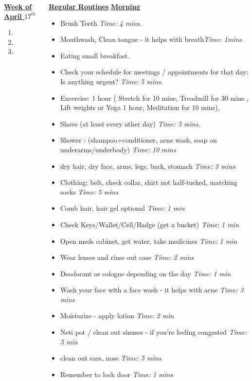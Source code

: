 \documentclass[serif, mathserif, final]{beamer}
\newcommand{\timeEst}[1]{\textit{Time:} \textit{#1}}
\begin{document}
{\begin{frame}{}
\begin{columns}
\begin{column}{0.5\linewidth}
\begin{block}{\small \underline{\textbf{Week of April $17^{th}$}}}
\begin{enumerate}
\tiny \item \tiny 
\item \tiny 
\item \tiny 
\end{enumerate}
\end{block}
\end{column}



\begin{column}{0.28\linewidth}
\begin{block}{\small \textbf{\underline{Regular Routines}} }
\underline{\textbf{Morning}}
\begin{itemize}
\tiny \item \tiny Brush Teeth \timeEst{4 mins}. 
\item \tiny Mouthwash, Clean tongue - it helps with breath\timeEst{1mins} 
\item \tiny Eating small breakfast. 
\item \tiny Check your schedule for meetings / appointments for that day: Is anything urgent? \timeEst{5 mins}. 
\item \tiny Excercise: 1 hour ( Stretch for 10 mins, Treadmill for 30 mins , Lift weights or Yoga 1 hour, Meditation for 10 mins). 
\item \tiny Shave (at least every other day) \timeEst{5 mins}. 
\item \tiny Shower : (shampoo+conditioner, acne wash,  soap on underarms/underbody)
\timeEst{10 mins}
\item \tiny dry hair, dry face, arms, legs, back, stomach \timeEst{3 mins}
\item \tiny Clothing: belt, check collar, shirt not half-tucked, matching socks \timeEst{5 mins}
\item \tiny Comb hair, hair gel optional \timeEst{ 1 min}
\item \tiny Check Keys/Wallet/Cell/Badge (get a bucket) \timeEst{1 min}
\item \tiny Open meds cabinet, get water, take medicines \timeEst{1 min}
\item \tiny Wear lenses and rinse out case \timeEst{ 2 mins}
\item \tiny Deodorant or cologne depending on the day \timeEst{1 min}
\item \tiny Wash your face with a face wash - it helps with acne \timeEst{3 mins}
\item \tiny Moisturize - apply lotion \timeEst{ 2 min}
\item \tiny Neti pot / clean out sinuses - if you’re feeling congested \timeEst{5 min}
\item \tiny clean out ears, nose \timeEst{5 mins}
\item \tiny Remember to lock door \timeEst{1 mins}
\end{itemize} 


\end{block}
\end{column}
\end{columns}
\end{frame}}
\end{document}

